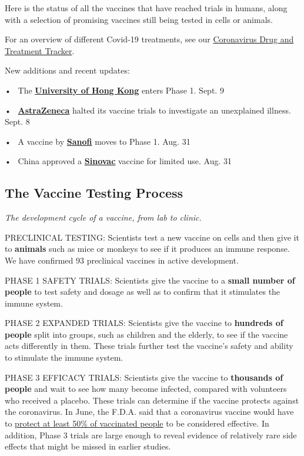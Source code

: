 Here is the status of all the vaccines that have reached trials in
humans, along with a selection of promising vaccines still being tested
in cells or animals.

For an overview of different Covid-19 treatments, see our
\href{https://www.nytimes3xbfgragh.onion/interactive/2020/science/coronavirus-drugs-treatments.html}{Coronavirus
Drug and Treatment Tracker}.

New additions and recent updates:

•~ The \textbf{\textbf{\protect\hyperlink{hku}{University of Hong
Kong}}} enters Phase 1. Sept. 9

•~ \textbf{\textbf{\protect\hyperlink{astrazeneca}{AstraZeneca}}} halted
its vaccine trials to investigate an unexplained illness. Sept. 8

•~ A vaccine by \textbf{\textbf{\protect\hyperlink{sanofi2}{Sanofi}}}
moves to Phase 1. Aug. 31

•~ China approved a
\textbf{\textbf{\protect\hyperlink{sinovac}{Sinovac}}} vaccine for
limited use. Aug. 31

\hypertarget{the-vaccine-testing-process}{%
\subsection{\texorpdfstring{\textbf{The Vaccine Testing
Process}}{The Vaccine Testing Process}}\label{the-vaccine-testing-process}}

\emph{The development cycle of a vaccine, from lab to clinic.}

PRECLINICAL TESTING: Scientists test a new vaccine on cells and then
give it to \textbf{\textbf{animals}} such as mice or monkeys to see if
it produces an immune response. We have confirmed 93 preclinical
vaccines in active development.

PHASE 1 SAFETY TRIALS: Scientists give the vaccine to a
\textbf{\textbf{small number of people}} to test safety and dosage as
well as to confirm that it stimulates the immune system.

PHASE 2 EXPANDED TRIALS: Scientists give the vaccine to
\textbf{\textbf{hundreds of people}} split into groups, such as children
and the elderly, to see if the vaccine acts differently in them. These
trials further test the vaccine's safety and ability to stimulate the
immune system.

PHASE 3 EFFICACY TRIALS: Scientists give the vaccine to
\textbf{\textbf{thousands of people}} and wait to see how many become
infected, compared with volunteers who received a placebo. These trials
can determine if the vaccine protects against the coronavirus. In June,
the F.D.A. said that a coronavirus vaccine would have to
\href{https://www.fda.gov/news-events/press-announcements/coronavirus-covid-19-update-fda-takes-action-help-facilitate-timely-development-safe-effective-covid}{protect
at least 50\% of vaccinated people} to be considered effective. In
addition, Phase 3 trials are large enough to reveal evidence of
relatively rare side effects that might be missed in earlier studies.


